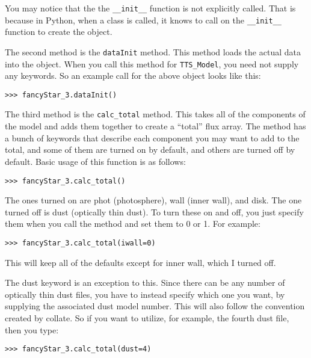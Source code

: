 \documentclass{article}
\begin{document}
You may notice that the the \texttt{\_\_init\_\_} function is not explicitly called. That is because in Python, when a class is called, it knows to call on the \texttt{\_\_init\_\_} function to create the object. 
\vspace{2mm}
 
\noindent The second method is the \texttt{dataInit} method. This method loads the actual data into the object. When you call this method for \texttt{TTS\_Model}, you need not supply any keywords. So an example call for the above object looks like this: 
 
\vspace{2mm}
\texttt{>>> fancyStar\_3.dataInit()}
\vspace{2mm}

The third method is the \texttt{calc\_total} method. This takes all of the components of the model and adds them together to create a “total” flux array. The method has a bunch of keywords that describe each component you may want to add to the total, and some of them are turned on by default, and others are turned off by default. Basic usage of this function is as follows:

\vspace{2mm}
\texttt{>>> fancyStar\_3.calc\_total()}
\vspace{2mm}

\noindent The ones turned on are phot (photosphere), wall (inner wall), and disk. The one turned off is dust (optically thin dust). To turn these on and off, you just specify them when you call the method and set them to 0 or 1. For example: 

\vspace{2mm}
\texttt{>>> fancyStar\_3.calc\_total(iwall=0)}
\vspace{2mm}
 
\noindent This will keep all of the defaults except for inner wall, which I turned off. 
\vspace{2mm}
 
\noindent The dust keyword is an exception to this. Since there can be any number of optically thin dust files, you have to instead specify which one you want, by supplying the associated dust model number. This will also follow the convention created by collate. So if you want to utilize, for example, the fourth dust file, then you type: 

\vspace{2mm}
\texttt{>>> fancyStar\_3.calc\_total(dust=4)}
\vspace{2mm}
 
\end{document}

